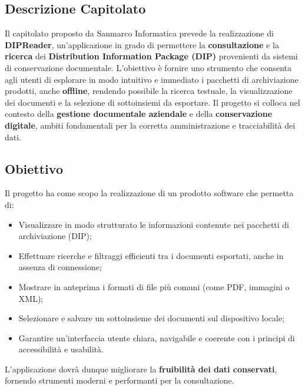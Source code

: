 \documentclass[a4paper,12pt]{article}
\begin{document}
{{    \subsection{Descrizione Capitolato}
        Il capitolato proposto da Sanmarco Informatica prevede la realizzazione di \textbf{DIPReader}, un’applicazione in grado di permettere la \textbf{consultazione} e la \textbf{ricerca} dei \textbf{Distribution Information Package (DIP)} provenienti da sistemi di conservazione documentale.
        L’obiettivo è fornire uno strumento che consenta agli utenti di esplorare in modo intuitivo e immediato i pacchetti di archiviazione prodotti, anche \textbf{offline}, rendendo possibile la ricerca testuale, la visualizzazione dei documenti e la selezione di sottoinsiemi da esportare.
        Il progetto si colloca nel contesto della \textbf{gestione documentale aziendale} e della \textbf{conservazione digitale}, ambiti fondamentali per la corretta amministrazione e tracciabilità dei dati.
    

    \subsection{Obiettivo}
        Il progetto ha come scopo la realizzazione di un prodotto software che permetta di:
        \begin{itemize}
            \item Visualizzare in modo strutturato le informazioni contenute nei pacchetti di archiviazione (DIP);
            \item Effettuare ricerche e filtraggi efficienti tra i documenti esportati, anche in assenza di connessione;
            \item Mostrare in anteprima i formati di file più comuni (come PDF, immagini o XML);
            \item Selezionare e salvare un sottoinsieme dei documenti sul dispositivo locale;
            \item Garantire un’interfaccia utente chiara, navigabile e coerente con i principi di accessibilità e usabilità.
        \end{itemize}
        L’applicazione dovrà dunque migliorare la \textbf{fruibilità dei dati conservati}, fornendo strumenti moderni e performanti per la consultazione.
    

}}
\end{document}
